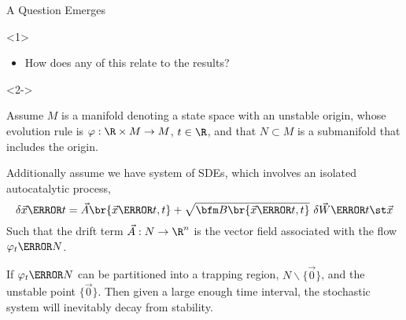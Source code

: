 \documentclass[aspectratio=169, onlytextwidth,  notheorems, sOuRcEs, fleqn, leqno, ]{RUCPresentation}
\begin{document}
\begin{frame}{ A Question Emerges }



    \begin{onlyenv}<1>

    \begin{itemize}
        \item How does any of this relate to the results?
    \end{itemize}

    \end{onlyenv}

    \begin{onlyenv}<2->
        \begin{proposition}[name={Stochastic Stability Decay}] \label{prp.ssd}

            Assume \(M\) is a manifold denoting a state space with an unstable origin,
            whose {evolution rule} is \(\varphi:\R\times M\to M\),
            \(t\in\R\), and that \(N\subset M\) is a submanifold that includes the origin.

            Additionally assume we have system of SDEs,
            which involves an isolated autocatalytic process,
            \begin{equation*}
                \hfill
                \delta \vec{x}\of t
                = \vec{A}\br{\vec{x}\of t, t}
                + \sqrt{\bfm B\br{\vec{x}\of t, t}} \ \delta{\vec{W}\of{t\st \vec{x}}}
                \hfill
            \end{equation*}
            Such that the drift term \(\vec{A}:N\to\R^n\) is the vector field
            associated with the flow \(\varphi_t\of N\).

            If \(\varphi_t\of{N}\) can be partitioned into a trapping region,
            \(N\backslash\{\vec{0}\}\), and the unstable point \(\{\vec{0}\}\).
            Then given a large enough time interval,
            the stochastic system will inevitably decay from stability.

        \end{proposition}
    \end{onlyenv}

\end{frame}
\end{document}
